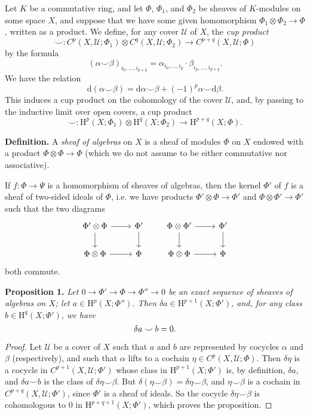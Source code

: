 \documentclass{article}
\newenvironment{itenv}[1]
  {\phantomsection\par\medskip\noindent\textbf{#1.}\itshape}
  {\par\medskip}
\newenvironment{rmenv}[1]
  {\phantomsection\par\medskip\noindent\textbf{#1.}\rmfamily}
  {\par\medskip}
\newcommand{\scr}[1]{{\mathscr{#1}}}
\newcommand{\HH}{\mathrm{H}}
\newcommand{\dd}{\mathrm{d}}
\newcommand{\oldpage}[1]{\marginpar{\footnotesize$\Big\vert$ \textit{p.~#1}}}
\begin{document}
Let $K$ be a commutative ring, and let $\Phi$, $\Phi_1$, and $\Phi_2$ be sheaves of $K$-modules on some space $X$, and suppose that we have some given homomorphism $\Phi_1\otimes\Phi_2\to\Phi$, written as a product.
We define, for any cover $\scr{U}$ of $X$, the \emph{cup product}
\[
  \smile\colon C^p(X,\scr{U};\Phi_1) \otimes C^q(X,\scr{U};\Phi_2)
  \to C^{p+q}(X,\scr{U};\Phi)
\]
by the formula
\[
  (\alpha\smile\beta)_{i_0,\ldots,i_{p+q}}
  = \alpha_{i_0,\ldots,i_p}\cdot\beta_{i_p,\ldots,i_{p+q}}.
\]
We have the relation
\[
  \dd(\alpha\smile\beta) = \dd\alpha\smile\beta + (-1)^p\alpha\smile\dd\beta.
\]
This induces a cup product on the cohomology of the cover $\scr{U}$, and, by passing to the inductive limit over open covers, a cup product
\[
  \smile\colon \HH^p(X;\Phi_1) \otimes \HH^q(X;\Phi_2)
  \to \HH^{p+q}(X;\Phi).
\]

\oldpage{4-02}
\begin{rmenv}{Definition}
  A \emph{sheaf of algebras} on $X$ is a sheaf of modules $\Phi$ on $X$ endowed with a product $\Phi\otimes\Phi\to\Phi$ (which we do not assume to be either commutative nor associative).
\end{rmenv}

If $f\colon\Phi\to\Psi$ is a homomorphism of sheaves of algebras, then the kernel $\Phi'$ of $f$ is a sheaf of two-sided ideals of $\Phi$, i.e. we have products $\Phi'\otimes\Phi\to\Phi'$ and $\Phi\otimes\Phi'\to\Phi'$ such that the two diagrams
\[
  \begin{tikzcd}
    \Phi'\otimes\Phi \rar \dar
    & \Phi' \dar
  \\\Phi\otimes\Phi \rar
    & \Phi
  \end{tikzcd}
  \qquad
  \begin{tikzcd}
    \Phi\otimes\Phi' \rar \dar
    & \Phi' \dar
  \\\Phi\otimes\Phi \rar
    & \Phi
  \end{tikzcd}
\]
both commute.

\begin{itenv}{Proposition 1}
\label{proposition1}
  Let $0\to\Phi'\to\Phi\to\Phi''\to0$ be an exact sequence of sheaves of algebras on $X$;
  let $a\in\HH^p(X;\Phi'')$.
  Then $\delta a\in\HH^{p+1}(X;\Phi')$, and, for any class $b\in\HH^q(X;\Phi')$, we have
  \[
    \delta a\smile b=0.\qedhere
  \]
\end{itenv}

\begin{proof}
  Let $\scr{U}$ be a cover of $X$ such that $a$ and $b$ are represented by cocycles $\alpha$ and $\beta$ (respectively), and such that $\alpha$ lifts to a cochain $\eta\in C^p(X,\scr{U};\Phi)$.
  Then $\delta\eta$ is a cocycle in $C^{p+1}(X,\scr{U};\Phi')$ whose class in $\HH^{p+1}(X;\Phi')$ is, by definition, $\delta a$, and $\delta a\smile b$ is the class of $\delta\eta\smile\beta$.
  But $\delta(\eta\smile\beta)=\delta\eta\smile\beta$, and $\eta\smile\beta$ is a cochain in $C^{p+q}(X,\scr{U};\Phi')$, since $\Phi'$ is a sheaf of ideals.
  So the cocycle $\delta\eta\smile\beta$ is cohomologous to $0$ in $\HH^{p+q+1}(X;\Phi')$, which proves the proposition.
\end{proof}
\end{document}
